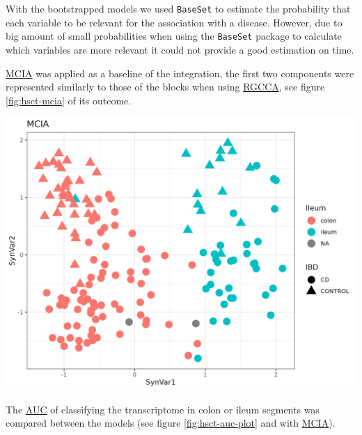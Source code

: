 \documentclass[
  12pt,
  a4paper,
  twoside,
  openright]{book}
\let\origfigure\figure
\let\endorigfigure\endfigure
\renewenvironment{figure}[1][2] {
    \expandafter\origfigure\expandafter[!htbp]
} {
    \endorigfigure
}
\begin{document}
With the bootstrapped models we used \texttt{BaseSet} to estimate the probability that each variable to be relevant for the association with a disease.
However, due to big amount of small probabilities when using the \texttt{BaseSet} package to calculate which variables are more relevant it could not provide a good estimation on time.

\protect\hyperlink{acronyms_MCIA}{MCIA} was applied as a baseline of the integration, the first two components were represented similarly to those of the blocks when using \protect\hyperlink{acronyms_RGCCA}{RGCCA}, see figure \ref{fig:hsct-mcia} of its outcome.

\begin{figure}
\includegraphics[width=1\linewidth]{images/hsct-mcia} \caption[MCIA dimensions in the HSCT dataset.]{MCIA dimensions in the HSCT dataset. MCIA first two synthetic variables. The first variable separates the samples in colon and ileum. Each point represents a sample (colored by location and shape by disease).}\label{fig:hsct-mcia}
\end{figure}

The \protect\hyperlink{acronyms_AUC}{AUC} of classifying the transcriptome in colon or ileum segments was compared between the models (see figure \ref{fig:hsct-auc-plot} and with \protect\hyperlink{acronyms_MCIA}{MCIA}).
\end{document}
